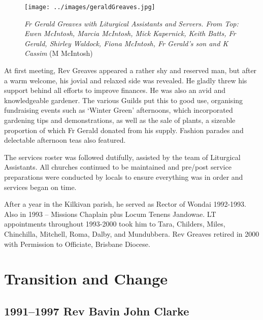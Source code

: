 \begin{figure}[!htb]
\begin{center}
\texttt{[image: ../images/geraldGreaves.jpg]}
\caption{{\itshape Fr Gerald Greaves with Liturgical Assistants and Servers. From Top: Ewen McIntosh, Marcia McIntosh, Mick Kapernick, Keith Batts, Fr Gerald, Shirley Waldock, Fiona McIntosh, Fr Gerald's son and K Cassim} {\scriptsize(M McIntosh)}}
\end{center}
\end{figure}




At first meeting, Rev Greaves appeared a rather shy and reserved man, but after a warm welcome, his jovial and relaxed side was revealed. He gladly threw his support behind all efforts to improve finances. He was also an avid and knowledgeable gardener. The various Guilds put this to good use, organising fundraising events such as `Winter Green' afternoons, which incorporated gardening tips and demonstrations, as well as the sale of plants, a sizeable proportion of which Fr Gerald donated from his supply. Fashion parades and delectable afternoon teas also featured.



The services roster was followed dutifully, assisted by the team of Liturgical Assistants. All churches continued to be maintained and pre/post service preparations were conducted by locals to ensure everything was in order and services began on time.



After a year in the Kilkivan parish, he served as Rector of Wondai 1992-1993. Also in 1993 -- Missions Chaplain plus Locum Tenens Jandowae. LT appointments throughout 1993-2000 took him to Tara, Childers, Miles, Chinchilla, Mitchell, Roma, Dalby, and Mundubbera. Rev Greaves retired in 2000 with Permission to Officiate, Brisbane Diocese.



\printendnotes[custom]
\setcounter{endnote}{0}




\chapter{Transition and Change}
\nobalance


\section{1991--1997 Rev Bavin John Clarke}



